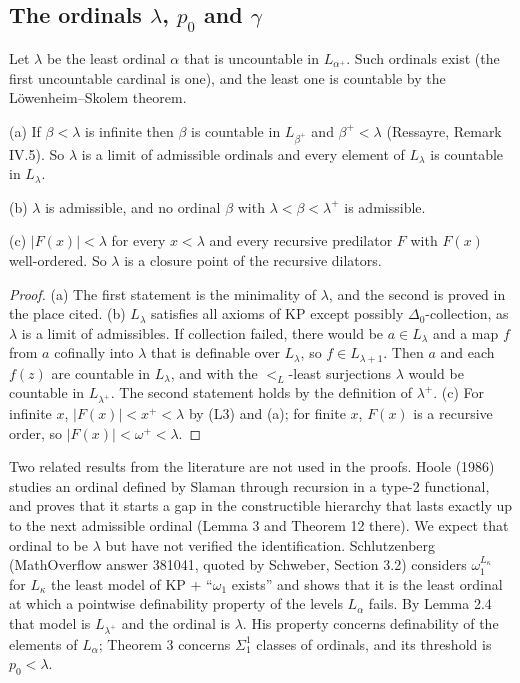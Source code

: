 \documentclass[11pt]{article}
\begin{document}
\subsection{The ordinals $\lambda$, $p_0$ and $\gamma$}

Let $\lambda$ be the least ordinal $\alpha$ that is uncountable in $L_{\alpha^+}$. Such ordinals exist (the first
uncountable cardinal is one), and the least one is countable by the L\"owenheim--Skolem theorem.

\begin{statement} (a) If $\beta < \lambda$ is infinite then $\beta$ is countable in $L_{\beta^+}$ and
$\beta^+ < \lambda$ (Ressayre, Remark IV.5). So $\lambda$ is a limit of admissible ordinals and every element of $L_\lambda$ is
countable in $L_\lambda$.

(b) $\lambda$ is admissible, and no ordinal $\beta$ with $\lambda < \beta < \lambda^+$ is admissible.

(c) $|F(x)| < \lambda$ for every $x < \lambda$ and every recursive predilator $F$ with $F(x)$ well-ordered. So $\lambda$ is a
closure point of the recursive dilators.
\end{statement}

\begin{proof} (a) The first statement is the minimality of $\lambda$, and the second is proved in the place cited. (b)
$L_\lambda$ satisfies all axioms of KP except possibly $\Delta_0$-collection, as $\lambda$ is a limit of admissibles. If
collection failed, there would be $a \in L_\lambda$ and a map $f$ from $a$ cofinally into $\lambda$ that is definable over
$L_\lambda$, so $f \in L_{\lambda+1}$. Then $a$ and each $f(z)$ are countable in $L_\lambda$, and with the $<_L$-least surjections
$\lambda$ would be countable in $L_{\lambda^+}$. The second statement holds by the definition of $\lambda^+$. (c) For infinite $x$,
$|F(x)| < x^+ < \lambda$ by (L3) and (a); for finite $x$, $F(x)$ is a recursive order, so $|F(x)| < \omega^+ < \lambda$.
\end{proof}

Two related results from the literature are not used in the proofs. Hoole (1986) studies an ordinal defined by
Slaman through recursion in a type-2 functional, and proves that it starts a gap in the constructible hierarchy
that lasts exactly up to the next admissible ordinal (Lemma 3 and Theorem 12 there). We expect that ordinal to be
$\lambda$ but have not verified the identification.
Schlutzenberg (MathOverflow answer 381041, quoted by Schweber, Section 3.2) considers $\omega_1^{L_\kappa}$ for
$L_\kappa$ the least model of KP + ``$\omega_1$ exists'' and shows that it is the least ordinal at which a
pointwise definability property of the levels $L_{\alpha}$ fails. By Lemma 2.4 that model is $L_{\lambda^+}$ and the
ordinal is $\lambda$. His property concerns definability of the elements of $L_{\alpha}$; Theorem 3 concerns
$\Sigma^1_1$ classes of ordinals, and its threshold is $p_0 < \lambda$.
\end{document}
